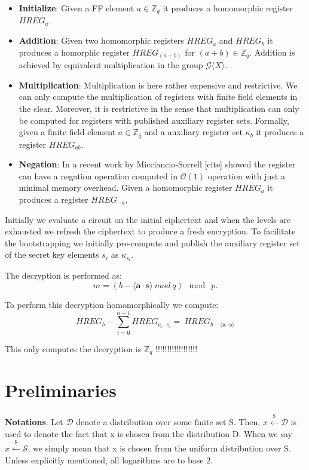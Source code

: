 \documentclass[10pt,journal,compsoc]{IEEEtran}
\theoremstyle{definition}
\begin{document}
\begin{itemize}
\item \textbf{Initialize}: Given a FF element $a \in \mathbb{Z}_q$ it produces a homomorphic register $HREG_a$.

\item \textbf{Addition}: Given two homomorphic registers $HREG_a$ and $HREG_b$ it produces a homorphic register $HREG_{(a+b)}$ for $(a+b)\in \mathbb{Z}_q$. Addition is achieved by equivalent multiplication in the group $\mathcal{G}\langle X \rangle$.

\item \textbf{Multiplication}: Multiplication is here rather expensive and restrictive. We can only compute the multiplication of registers with finite field elements in the clear. Moreover, it is restrictive in the sense that multiplication can only be computed for registers with published auxiliary register sets. Formally, given a finite field element $a \in \mathbb{Z}_q$ and a auxiliary register set $\kappa_b$ it produces a register $HREG_{ab}$.

\item \textbf{Negation}: In a recent work by Micciancio-Sorrell [cite] showed the register can have a negation operation computed in $\mathcal{O}(1)$ operation with just a minimal memory overhead. Given a homomorphic register $HREG_a$ it produces a register $HREG_{-a}$. 
\end{itemize}

Initially we evaluate a circuit on the initial ciphertext and when the levels are exhausted we refresh the ciphertext to produce a fresh encryption. To facilitate the bootstrapping we initially pre-compute and publish the auxiliary register set of the secret key elements $s_i$ as $\kappa_{s_i}$.

The decryption is performed as: $$m = \left(b - \langle \textbf{a}\cdot\textbf{s} \rangle\ mod\ q\right) \mod\ p.$$

To perform this decryption homomorphically we compute: $$HREG_b - \sum_{i=0}^{n-1}HREG_{a_i \cdot s_i} =\ HREG_{b - \langle \textbf{a}\cdot\textbf{s} \rangle}$$

This only computes the decryption is $\mathbb{Z}_q$ !!!!!!!!!!!!!!!!!!


\section{Preliminaries}

\textbf{Notations}. Let $\mathcal{D}$ denote a distribution over some finite set S. Then, $x \xleftarrow{\$} \mathcal{D}$ is used to denote the fact that x is chosen from the distribution D. When we say $x\xleftarrow{\$} \mathcal{S}$, we simply mean that x is chosen from the uniform distribution over S. Unless explicitly mentioned, all logarithms are to base 2.
\end{document}
